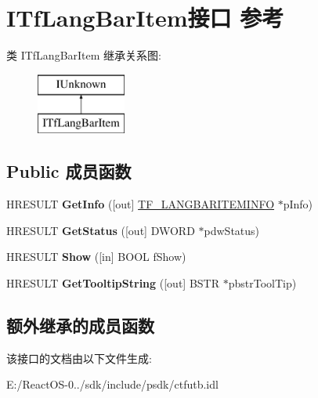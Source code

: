 \hypertarget{interface_i_tf_lang_bar_item}{}\section{I\+Tf\+Lang\+Bar\+Item接口 参考}
\label{interface_i_tf_lang_bar_item}
类 I\+Tf\+Lang\+Bar\+Item 继承关系图\+:\begin{figure}[H]
\begin{center}
\leavevmode
\includegraphics[height=2.000000cm]{interface_i_tf_lang_bar_item}
\end{center}
\end{figure}
\subsection*{Public 成员函数}
\begin{DoxyCompactItemize}
\item 
\mbox{\label{interface_i_tf_lang_bar_item_acac1d7a61dbf9d44f8a1e4a523856c20}} 
H\+R\+E\+S\+U\+LT {\bfseries Get\+Info} (\mbox{[}out\mbox{]} \hyperlink{struct_t_f___l_a_n_g_b_a_r_i_t_e_m_i_n_f_o}{T\+F\+\_\+\+L\+A\+N\+G\+B\+A\+R\+I\+T\+E\+M\+I\+N\+FO} $\ast$p\+Info)
\item 
\mbox{\label{interface_i_tf_lang_bar_item_a1772a0430f150916aa800edaf2ef9254}} 
H\+R\+E\+S\+U\+LT {\bfseries Get\+Status} (\mbox{[}out\mbox{]} D\+W\+O\+RD $\ast$pdw\+Status)
\item 
\mbox{\label{interface_i_tf_lang_bar_item_ad7f49803ae677d5718f0e85c074497bb}} 
H\+R\+E\+S\+U\+LT {\bfseries Show} (\mbox{[}in\mbox{]} B\+O\+OL f\+Show)
\item 
\mbox{\label{interface_i_tf_lang_bar_item_a8556c797f790b1562249503d23c04980}} 
H\+R\+E\+S\+U\+LT {\bfseries Get\+Tooltip\+String} (\mbox{[}out\mbox{]} B\+S\+TR $\ast$pbstr\+Tool\+Tip)
\end{DoxyCompactItemize}
\subsection*{额外继承的成员函数}


该接口的文档由以下文件生成\+:\begin{DoxyCompactItemize}
\item 
E\+:/\+React\+O\+S-\/0../sdk/include/psdk/ctfutb.\+idl\end{DoxyCompactItemize}
